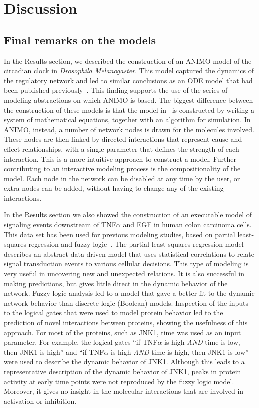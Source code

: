 \documentclass{bmcart}
\begin{document}
\section*{Discussion}
\subsection*{Final remarks on the models}
In the Results section, we described the construction of an ANIMO
model of the circadian clock in \emph{Drosophila Melanogaster}. This model
captured the dynamics of the regulatory network and led to similar
conclusions as an ODE model that had been
published previously~\cite{drosophila-ode-model}. This finding supports the use of
the series of modeling abstractions on which ANIMO is based. The biggest
difference between the construction of these models is that the model in~\cite{drosophila-ode-model}
is constructed by writing a system of mathematical equations, together
with an algorithm for simulation. In ANIMO, instead, a number of network
nodes is drawn for the molecules involved.
These nodes are then linked by directed
interactions that represent cause-and-effect relationships, with a single parameter
that defines the strength of each
interaction. This is a more intuitive approach to construct a model.
Further contributing to an interactive modeling process
is the compositionality of the model. Each node in the network
can be disabled at any time by the user, or extra nodes can be added,
without having to change any of the existing interactions.

In the Results section we also showed the construction of an executable model
of signaling events downstream of
TNF$\alpha$ and EGF in human colon carcinoma cells. This data set has been used for
previous modeling studies, based on partial least-squares regression and fuzzy
logic~\cite{pathway-leastsquare,pathway-fuzzy}.
The partial least-squares regression model describes an abstract data-driven model
that uses statistical correlations
to relate signal transduction events to various cellular decisions. This type of modeling is
very useful in uncovering new and unexpected relations. It is also successful in making
predictions, but gives little direct in the dynamic behavior of the network. Fuzzy
logic analysis led to a model that gave a better fit to the dynamic network behavior than
discrete logic (Boolean) models. Inspection of the inputs to the logical gates that were used
to model protein behavior led to the prediction of novel interactions between proteins,
showing the usefulness of this approach. For most of the proteins, such as JNK1, time was
used as an input parameter. For example, the logical gates ``if TNF$\alpha$ is high
\emph{AND} time is low, then JNK1 is high'' and ``if TNF$\alpha$ is high \emph{AND} time is
high, then JNK1 is low'' were used to
describe the dynamic behavior of JNK1. Although this leads to a representative
description of the dynamic behavior of JNK1, peaks in protein activity at early time points were
not reproduced by the fuzzy logic model. Moreover, it gives no insight in the molecular interactions
that are involved in activation or inhibition.
\end{document}
